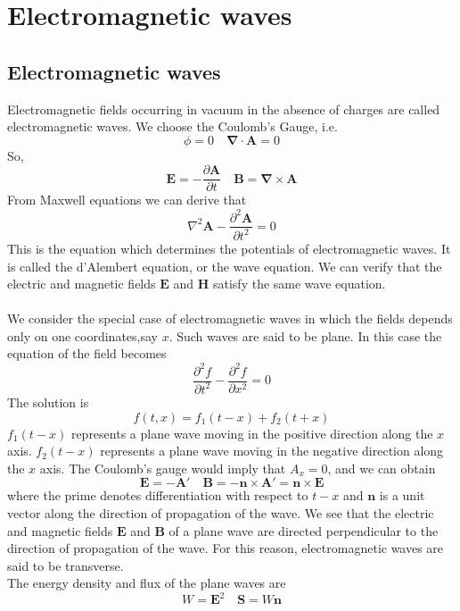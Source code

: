 \section{Electromagnetic waves}
\subsection{Electromagnetic waves}
Electromagnetic fields occurring in vacuum in the absence of  charges are called electromagnetic waves. We choose the Coulomb's Gauge, i.e.
\[ \phi = 0 \quad \bm{\nabla} \cdot \bm{A} = 0\]
So,
\[\bm{E} = -\frac{\partial \bm{A}}{\partial t} \quad \bm{B} = \bm{\nabla} \times \bm{A}\]
From Maxwell equations we can derive that
\[\nabla^2 \bm{A} - \frac{\partial^2 \bm{A}}{\partial t^2} = 0\]
This is the equation which determines the potentials of electromagnetic waves. It is called the d'Alembert equation, or the wave equation. We can verify that the electric and magnetic fields $\bm{E}$ and $\bm{H}$ satisfy the same wave equation.
\\ \\
We consider the special case of electromagnetic waves in which the fields depends only on one coordinates,say $x$. Such waves are said to be plane. In this case the equation of the field becomes
\[\frac{\partial^2 f}{\partial t^2}  - \frac{\partial^2 f}{\partial x^2} = 0\]
The solution is
\[f(t,x) = f_1(t-x) + f_2(t+x)\]
$f_1(t-x)$ represents a plane wave moving in the positive direction along the $x$ axis. $f_2(t-x)$ represents a plane wave moving in the negative direction along the $x$ axis. The Coulomb's gauge would imply that $A_x = 0$, and we can obtain
\[\bm{E} = -\bm{A}' \quad \bm{B} = -\bm{n} \times \bm{A}' = \bm{n} \times \bm{E}\]
where the prime denotes differentiation with respect to $t-x$ and $\bm{n}$ is a unit vector along the direction of propagation of the wave. We see that the electric and magnetic fields $\bm{E}$ and $\bm{B}$ of a plane wave are directed perpendicular to the direction of propagation of the wave. For this reason, electromagnetic waves are said to be transverse.\\
The energy density and flux of the plane waves are
\[W = \bm{E}^2 \quad \bm{S} = W\bm{n}\]

